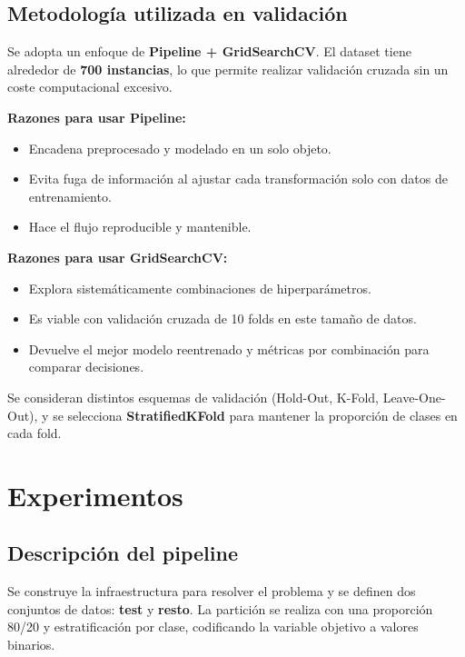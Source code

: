 \documentclass[12pt]{article}
\begin{document}
\subsection{Metodología utilizada en validación}
Se adopta un enfoque de \textbf{Pipeline + GridSearchCV}. El dataset tiene alrededor de
\textbf{700 instancias}, lo que permite realizar validación cruzada sin un coste computacional
excesivo.

\textbf{Razones para usar Pipeline:}
\begin{itemize}
    \item Encadena preprocesado y modelado en un solo objeto.
    \item Evita fuga de información al ajustar cada transformación solo con datos de entrenamiento.
    \item Hace el flujo reproducible y mantenible.
\end{itemize}

\textbf{Razones para usar GridSearchCV:}
\begin{itemize}
    \item Explora sistemáticamente combinaciones de hiperparámetros.
    \item Es viable con validación cruzada de 10 folds en este tamaño de datos.
    \item Devuelve el mejor modelo reentrenado y métricas por combinación para comparar decisiones.
\end{itemize}

Se consideran distintos esquemas de validación (Hold-Out, K-Fold, Leave-One-Out), y se selecciona
\textbf{StratifiedKFold} para mantener la proporción de clases en cada fold.

\section{Experimentos}
\subsection{Descripción del pipeline}
Se construye la infraestructura para resolver el problema y se definen dos conjuntos de datos:
\textbf{test} y \textbf{resto}. La partición se realiza con una proporción 80/20 y estratificación
por clase, codificando la variable objetivo a valores binarios.
\end{document}
